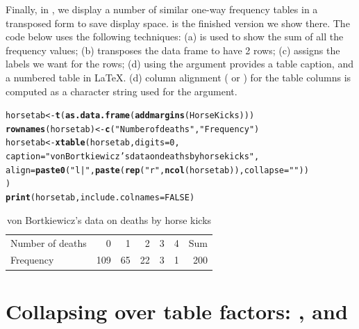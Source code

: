 \documentclass[11pt]{book}\usepackage[]{graphicx}\usepackage[]{color}
\makeatletter
\newcommand{\hlnum}[1]{\textcolor[rgb]{0.686,0.059,0.569}{#1}}%
\newcommand{\hlstr}[1]{\textcolor[rgb]{0.192,0.494,0.8}{#1}}%
\newcommand{\hlstd}[1]{\textcolor[rgb]{0.345,0.345,0.345}{#1}}%
\newcommand{\hlkwb}[1]{\textcolor[rgb]{0.69,0.353,0.396}{#1}}%
\newcommand{\hlkwc}[1]{\textcolor[rgb]{0.333,0.667,0.333}{#1}}%
\newcommand{\hlkwd}[1]{\textcolor[rgb]{0.737,0.353,0.396}{\textbf{#1}}}%
\newenvironment{kframe}{%
 \def\at@end@of@kframe{}%
 \ifinner\ifhmode%
  \def\at@end@of@kframe{\end{minipage}}%
  \begin{minipage}{\columnwidth}%
 \fi\fi%
 \def\FrameCommand##1{\hskip\@totalleftmargin \hskip-\fboxsep
 \colorbox{shadecolor}{##1}\hskip-\fboxsep
     \hskip-\linewidth \hskip-\@totalleftmargin \hskip\columnwidth}%
 \MakeFramed {\advance\hsize-\width
   \@totalleftmargin\z@ \linewidth\hsize
   \@setminipage}}%
 {\par\unskip\endMakeFramed%
 \at@end@of@kframe}
\makeatother
\begin{document}
Finally, in , we display a number of similar one-way
frequency tables in a transposed form to save display space.  
 is the finished version we show there. 
The code below uses the following techniques:
(a)  is used to show the sum of all the frequency values;
(b)  transposes the data frame to have 2 rows;
(c)  assigns the labels we want for the rows;
(d) using the  argument provides a table caption, and a numbered
table in \LaTeX.
(d) column alignment ( or ) for the table columns
is computed as a character string used for the  argument.
\begin{kframe}
\begin{alltt}
\hlstd{horsetab} \hlkwb{<-} \hlkwd{t}\hlstd{(} \hlkwd{as.data.frame}\hlstd{(} \hlkwd{addmargins}\hlstd{( HorseKicks ) ) )}
\hlkwd{rownames}\hlstd{( horsetab )} \hlkwb{<-} \hlkwd{c}\hlstd{(} \hlstr{"Number of deaths"}\hlstd{,} \hlstr{"Frequency"} \hlstd{)}
\hlstd{horsetab} \hlkwb{<-} \hlkwd{xtable}\hlstd{( horsetab,} \hlkwc{digits} \hlstd{=} \hlnum{0}\hlstd{,}
     \hlkwc{caption} \hlstd{=} \hlstr{"von Bortkiewicz's data on deaths by horse kicks"}\hlstd{,}
     \hlkwc{align} \hlstd{=} \hlkwd{paste0}\hlstd{(}\hlstr{"l|"}\hlstd{,} \hlkwd{paste}\hlstd{(}\hlkwd{rep}\hlstd{(}\hlstr{"r"}\hlstd{,} \hlkwd{ncol}\hlstd{(horsetab)),} \hlkwc{collapse}\hlstd{=}\hlstr{""}\hlstd{))}
     \hlstd{)}
\hlkwd{print}\hlstd{(horsetab,} \hlkwc{include.colnames}\hlstd{=}\hlnum{FALSE}\hlstd{)}
\end{alltt}
\end{kframe}%
\begin{table}[ht]
\centering
\begin{tabular}{l|rrrrrr}
  \hline
  \hline
Number of deaths & 0 & 1 & 2 & 3 & 4 & Sum \\ 
  Frequency & 109 &  65 &  22 &   3 &   1 & 200 \\ 
   \hline
\end{tabular}
\caption{von Bortkiewicz's data on deaths by horse kicks} 
\end{table}




\section[Collapsing over table factors]{Collapsing over table factors: ,  and }\label{sec:collapse}
\end{document}
